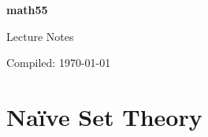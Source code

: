 \documentclass[12pt,oneside]{report}
\begin{document}
\begin{titlepage}
    \centering
    \vspace*{2cm}
    {\Huge\bfseries math55\par}
    \vspace{1cm}
    {\Large Lecture Notes\par}
    \vspace{2cm}
    {\Large Compiled: \today\par}
\end{titlepage}

\tableofcontents
\newpage

\pagestyle{head}




\section{Na\"ive Set Theory}

\end{document}
